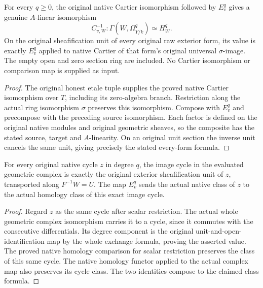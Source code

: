 \begin{theorem}
\label{thm:cartier-geometric-local-native-cartier}
\leanok
{}
For every $q\ge0$, the original native Cartier isomorphism followed by
$E_v^q$ gives a genuine $A$-linear isomorphism
\[
 C_{v,W}^{-1}:\Gamma(W,\Omega^q_{Y/k})\simeq H_W^q.
\]
On the original sheafification unit of every original raw exterior form,
its value is exactly $E_v^q$ applied to native Cartier of that form's
original universal $\sigma$-image. The empty open and zero section ring are
included. No Cartier isomorphism or comparison map is supplied as input.
\end{theorem}
\begin{proof}
The original honest etale tuple supplies the proved native Cartier
isomorphism over $T$, including its zero-algebra branch. Restriction
along the actual ring isomorphism $\sigma$ preserves this isomorphism.
Compose with $E_v^q$ and precompose with the preceding source isomorphism.
Each factor is defined on the original native modules and original
geometric sheaves, so the composite has the stated source, target
and $A$-linearity. On an original unit section the inverse unit cancels
the same unit, giving precisely the stated every-form formula.
\end{proof}

\begin{lemma}
\label{lem:cartier-geometric-local-cycle-unit}
\leanok
{}
For every original native cycle $z$ in degree $q$, the image cycle in
the evaluated geometric complex is exactly the original exterior
sheafification unit of $z$, transported along $F^{-1}W=U$.
The map $E_v^q$ sends the actual native class of $z$ to the actual
homology class of this exact image cycle.
\end{lemma}
\begin{proof}
Regard $z$ as the same cycle after scalar restriction. The actual
whole geometric complex isomorphism carries it to a cycle, since it
commutes with the consecutive differentials. Its degree component is
the original unit-and-open-identification map by the whole exchange
formula, proving the asserted value. The proved native homology
comparison for scalar restriction preserves the class of this same
cycle. The native homology functor applied to the actual complex map
also preserves its cycle class. The two identities compose to the
claimed class formula.
\end{proof}

